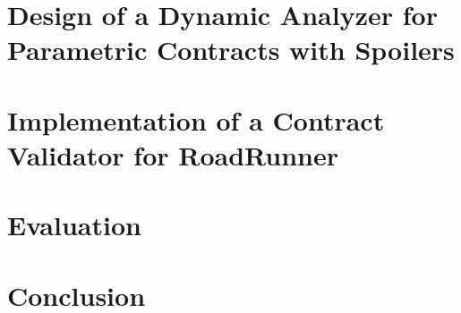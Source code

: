 \chapter{Design of a Dynamic Analyzer for Parametric Contracts with Spoilers}




\chapter{Implementation of a Contract Validator for RoadRunner}

\todo{}



\chapter{Evaluation}

\todo{}



\chapter{Conclusion}

\todo{}
